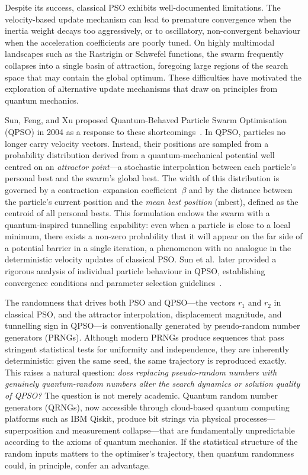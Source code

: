 Despite its success, classical PSO exhibits well-documented limitations.  The
velocity-based update mechanism can lead to premature convergence when the
inertia weight decays too aggressively, or to oscillatory, non-convergent
behaviour when the acceleration coefficients are poorly tuned.  On highly
multimodal landscapes such as the Rastrigin or Schwefel functions, the swarm
frequently collapses into a single basin of attraction, foregoing large regions
of the search space that may contain the global optimum.  These difficulties
have motivated the exploration of alternative update mechanisms that draw on
principles from quantum mechanics.

Sun, Feng, and Xu proposed Quantum-Behaved Particle Swarm Optimisation (QPSO)
in 2004 as a response to these shortcomings~\cite{Sun2004}.  In QPSO,
particles no longer carry velocity vectors.  Instead, their positions are
sampled from a probability distribution derived from a quantum-mechanical
potential well centred on an \emph{attractor point}---a stochastic
interpolation between each particle's personal best and the swarm's global
best.  The width of this distribution is governed by a contraction--expansion
coefficient~$\beta$ and by the distance between the particle's current
position and the \emph{mean best position} (mbest), defined as the centroid of
all personal bests.  This formulation endows the swarm with a quantum-inspired
tunnelling capability: even when a particle is close to a local minimum, there
exists a non-zero probability that it will appear on the far side of a
potential barrier in a single iteration, a phenomenon with no analogue in the
deterministic velocity updates of classical PSO.  Sun et al.\ later provided a
rigorous analysis of individual particle behaviour in QPSO, establishing
convergence conditions and parameter selection guidelines~\cite{Sun2012}.

The randomness that drives both PSO and QPSO---the vectors $r_1$ and $r_2$ in
classical PSO, and the attractor interpolation, displacement magnitude, and
tunnelling sign in QPSO---is conventionally generated by pseudo-random number
generators (PRNGs).  Although modern PRNGs produce sequences that pass
stringent statistical tests for uniformity and independence, they are
inherently deterministic: given the same seed, the same trajectory is
reproduced exactly.  This raises a natural question: \emph{does replacing
pseudo-random numbers with genuinely quantum-random numbers alter the search
dynamics or solution quality of QPSO?}  The question is not merely academic.
Quantum random number generators (QRNGs), now accessible through cloud-based
quantum computing platforms such as IBM Qiskit, produce bit strings via
physical processes---superposition and measurement collapse---that are
fundamentally unpredictable according to the axioms of quantum mechanics.  If
the statistical structure of the random inputs matters to the optimiser's
trajectory, then quantum randomness could, in principle, confer an advantage.

